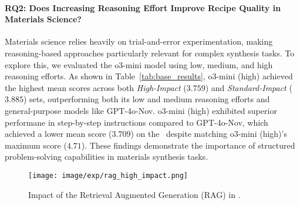 

\paragraph*{RQ2: Does Increasing Reasoning Effort Improve Recipe Quality in Materials Science?}  
Materials science relies heavily on trial-and-error experimentation, making reasoning-based approaches particularly relevant for complex synthesis tasks. To explore this, we evaluated the o3-mini model using low, medium, and high reasoning efforts. As shown in Table~\ref{tab:base_results}, o3-mini (high) achieved the highest mean scores across both \textit{High-Impact} (\(3.759\)) and \textit{Standard-Impact} (\(3.885\)) sets, outperforming both its low and medium reasoning efforts and general-purpose models like GPT-4o-Nov. o3-mini (high) exhibited superior performane in step-by-step instructions compared to GPT-4o-Nov, which achieved a lower mean score (\(3.709\)) on the \testhi~despite matching o3-mini (high)'s maximum score (\(4.71\)). These findings demonstrate the importance of structured problem-solving capabilities in materials synthesis tasks.

\begin{figure}[ht!]
    \centering
    \texttt{[image: image/exp/rag\_high\_impact.png]}
    \caption{Impact of the Retrieval Augmented Generation (RAG) in \testhi.}
    \label{fig:rag_high_impact}
\end{figure}
